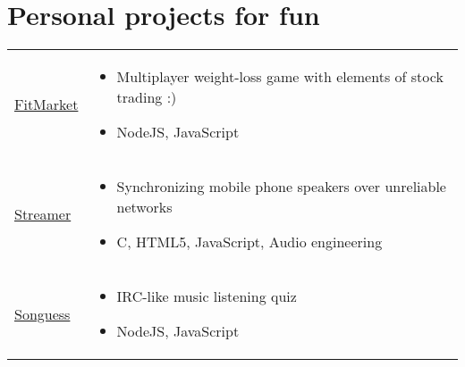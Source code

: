\documentclass[a4paper]{article}
\makeatletter
\newlength{\tablewidth}
\newenvironment{skills}{%
\setlength{\tablewidth}{\linewidth}
\addtolength{\tablewidth}{-2\tabcolsep}
\begin{tabular}{@{}p{0.15\tablewidth}p{0.85\tablewidth}@{}}
}{%
\end{tabular}
}
\makeatother
\begin{document}
\section{Personal projects for fun}
\begin{skills}
    \href{https://github.com/agrbin/fitmarket}{FitMarket} &
    \begin{itemize}
        \item Multiplayer weight-loss game with elements of stock trading :)
        \item NodeJS, JavaScript
    \end{itemize} \\
    \href{https://github.com/agrbin/streamer}{Streamer} &
    \begin{itemize}
        \item Synchronizing mobile phone speakers over unreliable networks
        \item C, HTML5, JavaScript, Audio engineering
    \end{itemize} \\
    \href{https://github.com/agrbin/songuess}{Songuess} &
    \begin{itemize}
        \item IRC-like music listening quiz
        \item NodeJS, JavaScript
    \end{itemize} \\
\end{skills}
\end{document}
